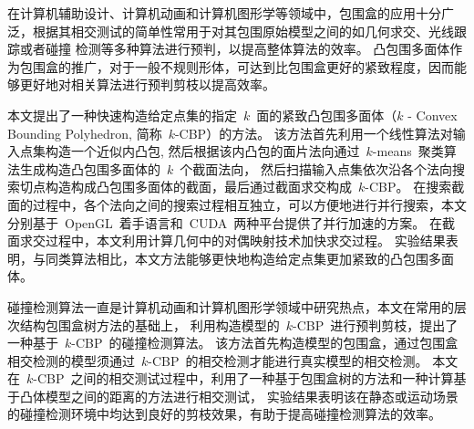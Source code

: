 \begin{cabstract}
  
在计算机辅助设计、计算机动画和计算机图形学等领域中，包围盒的应用十分广泛，根据其相交测试的简单性常用于对其包围原始模型之间的如几何求交、光线跟踪或者碰撞
检测等多种算法进行预判，以提高整体算法的效率。
凸包围多面体作为包围盒的推广，对于一般不规则形体，可达到比包围盒更好的紧致程度，因而能够更好地对相关算法进行预判剪枝以提高效率。

本文提出了一种快速构造给定点集的指定~$k$~面的紧致凸包围多面体（$k$ - Convex Bounding Polyhedron, 简称~$k$-CBP）的方法。
该方法首先利用一个线性算法对输入点集构造一个近似内凸包, 然后根据该内凸包的面片法向通过~$k$-means~聚类算法生成构造凸包围多面体的~$k$~个截面法向，
然后扫描输入点集依次沿各个法向搜索切点构造构成凸包围多面体的截面，最后通过截面求交构成~$k$-CBP。 
在搜索截面的过程中，各个法向之间的搜索过程相互独立，可以方便地进行并行搜索，本文分别基于~OpenGL~着手语言和~CUDA~两种平台提供了并行加速的方案。
在截面求交过程中，本文利用计算几何中的对偶映射技术加快求交过程。
实验结果表明，与同类算法相比，本文方法能够更快地构造给定点集更加紧致的凸包围多面体。

碰撞检测算法一直是计算机动画和计算机图形学领域中研究热点，本文在常用的层次结构包围盒树方法的基础上，
利用构造模型的~$k$-CBP~进行预判剪枝，提出了一种基于~$k$-CBP~的碰撞检测算法。
该方法首先构造模型的包围盒，通过包围盒相交检测的模型须通过~$k$-CBP~的相交检测才能进行真实模型的相交检测。
本文在~$k$-CBP~之间的相交测试过程中，利用了一种基于包围盒树的方法和一种计算基于凸体模型之间的距离的方法进行相交测试，
实验结果表明该在静态或运动场景的碰撞检测环境中均达到良好的剪枝效果，有助于提高碰撞检测算法的效率。



\end{cabstract}


